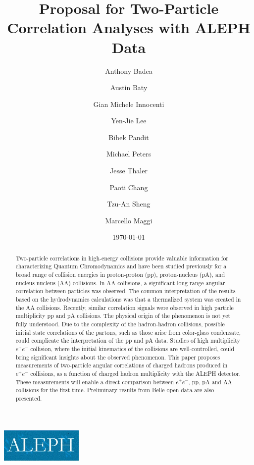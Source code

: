 \documentclass[%
preprint,
bibnotes,
]{revtex4-1}
\begin{document}
\includegraphics[width= 40mm]{aleph-logo.jpg}
\title{Proposal for Two-Particle Correlation Analyses with ALEPH Data}%

\author{Anthony Badea}%
\author{Austin Baty}%
\author{Gian Michele Innocenti}%
\author{Yen-Jie Lee}
\author{Bibek Pandit}%
\author{Michael Peters}%
\author{Jesse Thaler}%



\author{Paoti Chang}
\author{Tzu-An Sheng}

%

\author{Marcello Maggi}

\date{\today}%

\begin{abstract}
Two-particle correlations in high-energy collisions provide valuable information for characterizing Quantum Chromodynamics and have been studied previously for a broad range of collision energies in proton-proton (pp), proton-nucleus (pA), and nucleus-nucleus (AA) collisions. In AA collisions, a significant long-range angular correlation between particles was observed. The common interpretation of the results based on the hydrodynamics calculations was that a thermalized system was created in the AA collisions. Recently, similar correlation signals were observed in high particle multiplicity pp and pA collisions. The physical origin of the phenomenon is not yet fully understood. Due to the complexity of the hadron-hadron collisions, possible initial state correlations of the partons, such as those arise from color-glass condensate, could complicate the interpretation of the pp and pA data. Studies of high multiplicity $e^+e^-$ collision, where the initial kinematics of the collisions are well-controlled, could bring significant insights about the observed phenomenon. This paper proposes measurements of two-particle angular correlations of charged hadrons produced in $e^+e^-$ collisions, as a function of charged hadron multiplicity with the ALEPH detector. These measurements will enable a direct comparison between $e^+e^-$, pp, pA and AA collisions for the first time. Preliminary results from Belle open data are also presented.
\end{abstract}
\end{document}
